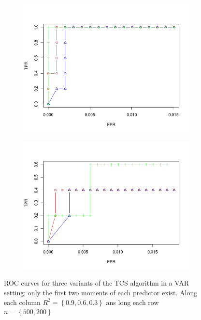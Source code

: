 \documentclass[11pt]{report}\usepackage[utf8]{inputenc}
\begin{document}
\begin{figure}[h]
\begin{subfigure}[b]{0.3\textwidth}
        \includegraphics[width=\textwidth]{../plots/200t06}
        \caption{}
    \end{subfigure}
    \begin{subfigure}[b]{0.3\textwidth}
        \includegraphics[width=\textwidth]{../plots/200t03}
        \caption{}
    \end{subfigure}
    \caption{ROC curves for three variants of the TCS algorithm in a VAR setting; only the first two moments of each predictor exist. Along each column $R^2 = \left \{ 0.9,0.6,0.3 \right \}$ ans long each row $n = \left \{ 500, 200 \right \}$}
    \label{testing A9 fig}
\end{figure}
\end{document}
